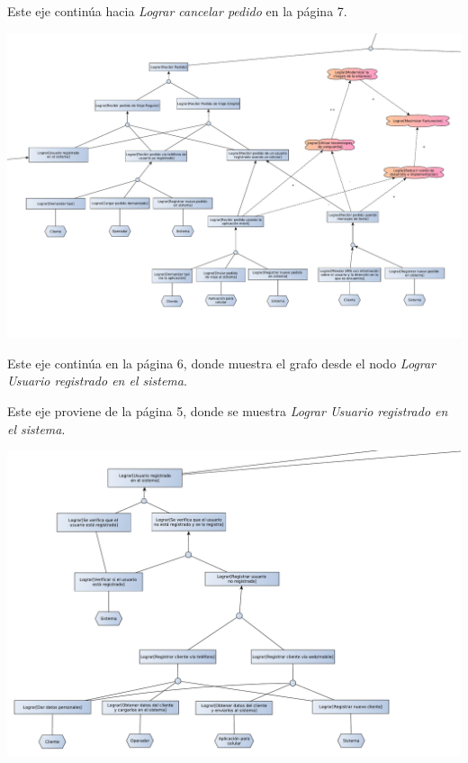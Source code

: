 \documentclass[a4paper]{article}
\begin{document}
\begin{center}
\begin{flushleft}
Este eje contin\'ua hacia \textit{Lograr cancelar pedido} en la p\'agina 7.
\end{flushleft}
\includegraphics[width=1.3\textwidth,keepaspectratio,angle=90]{diag_objetivos_partido/diag_objetivos_6.pdf}
\begin{center}
Este eje contin\'ua en la p\'agina 6, donde muestra el grafo desde el nodo \textit{Lograr Usuario registrado en el sistema}.
\end{center}
\newpage

\begin{flushleft}
Este eje proviene de la p\'agina 5, donde se muestra \textit{Lograr Usuario registrado en el sistema}.
\end{flushleft}
\includegraphics[width=1.3\textwidth,keepaspectratio,angle=90]{diag_objetivos_partido/diag_objetivos_5.pdf}


\end{center}
\end{document}
